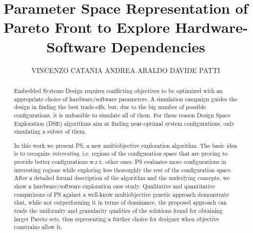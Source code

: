 \documentclass[prodmode,acmtecs]{acmsmall}
\begin{document}


\title{Parameter Space Representation of Pareto Front to
Explore Hardware-Software Dependencies}
\author{VINCENZO CATANIA
ANDREA ARALDO
DAVIDE PATTI
}

\begin{abstract}
Embedded Systems Design requires conflicting objectives to be
optimized with an appropriate choice of hardware/software parameters. A simulation campaign guides the design in finding the best trade-offs, but, due to the big number of possible configurations, it is unfeasible to simulate all of them. For these reason Design Space Exploration (DSE) algorithms aim at finding near-optimal system configurations, only simulating a subset of them.

In this work we present PS, a new multiobjective exploration algorithm. The basic idea is to recognize \emph{interesting}, i.e. regions of the configuration space that are proving to provide better configurations w.r.t. other ones. PS evaluates more configurations in interesting regions while exploring less thoroughly the rest of the configuration space. After a detailed formal description
of the algorithm and the underlying concepts, we show a hardware/software
exploration case study. Qualitative and quantitative comparisons of PS
against a well-know multiobjective genetic approach demonstrate that,
while not outperforming it in terms of dominance, the proposed
approach can trade the uniformity and granularity qualities of the
solutions found for obtaining larger Pareto sets, thus representing a
further choice for designer when objective constrains allow it.
\end{abstract}




\end{document}
